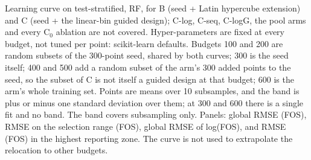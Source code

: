 Learning curve on test-stratified, RF, for B (seed + Latin hypercube extension) and C (seed + the linear-bin guided design); C-log, C-seq, C-logG, the pool arms and every C$_0$ ablation are not covered. Hyper-parameters are fixed at every budget, not tuned per point: scikit-learn defaults. Budgets 100 and 200 are random subsets of the 300-point seed, shared by both curves; 300 is the seed itself; 400 and 500 add a random subset of the arm's 300 added points to the seed, so the subset of C is not itself a guided design at that budget; 600 is the arm's whole training set. Points are means over 10 subsamples, and the band is plus or minus one standard deviation over them; at 300 and 600 there is a single fit and no band. The band covers subsampling only. Panels: global RMSE (FOS), RMSE on the selection range (FOS), global RMSE of log(FOS), and RMSE (FOS) in the highest reporting zone. The curve is not used to extrapolate the relocation to other budgets.
